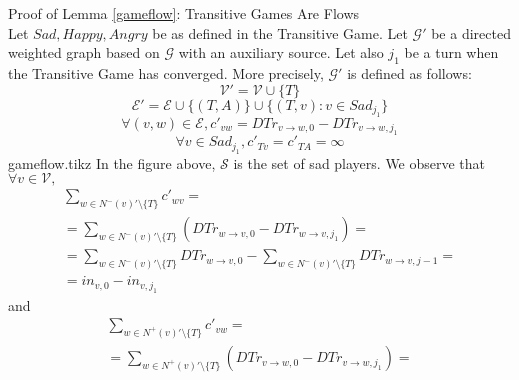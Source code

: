 \begin{sepproof}{Proof of Lemma \ref{gameflow}: Transitive Games Are Flows} \ \\
\label{gameflowproof}
   Let $Sad, Happy, Angry$ be as defined in the Transitive Game. Let $\mathcal{G}'$ be a directed weighted graph based on
   $\mathcal{G}$ with an auxiliary source. Let also $j_1$ be a turn when the Transitive Game has converged. More
   precisely, $\mathcal{G}'$ is defined as follows:
   \begin{equation*}
      \mathcal{V}' = \mathcal{V} \cup \{T\}
   \end{equation*}
   \begin{equation*}
      \mathcal{E}' = \mathcal{E} \cup \{(T, A)\} \cup \{(T, v) : v \in Sad_{j_1}\}
   \end{equation*}
   \begin{equation*}
      \forall (v, w) \in \mathcal{E}, c'_{vw} = DTr_{v \rightarrow w, 0} - DTr_{v \rightarrow w, j_1}
   \end{equation*}
   \begin{equation*}
      \forall v \in Sad_{j_1}, c'_{Tv} = c'_{TA} = \infty
   \end{equation*}
   {gameflow.tikz}
   In the figure above, $\mathcal{S}$ is the set of sad players. We observe that $\forall v \in \mathcal{V},$
   \begin{equation}
   \label{gameflowin}
   \begin{gathered}
      \sum\limits_{w \in N^{-}\left(v\right)' \setminus \{T\}}c'_{wv} = \\
      = \sum\limits_{w \in N^{-}\left(v\right)' \setminus \{T\}}\left(DTr_{w \rightarrow v, 0} -
      DTr_{w \rightarrow v, j_1}\right) = \\
      = \sum\limits_{w \in N^{-}\left(v\right)' \setminus \{T\}}DTr_{w \rightarrow v, 0} -
      \sum\limits_{w \in N^{-}\left(v\right)' \setminus \{T\}}DTr_{w \rightarrow v, j-1} =  \\
      = in_{v, 0} - in_{v, j_1}
   \end{gathered}
   \end{equation}
   and
   \begin{equation}
   \label{gameflowout}
   \begin{gathered}
      \sum\limits_{w \in N^{+}\left(v\right)' \setminus \{T\}}c'_{vw} = \\
      = \sum\limits_{w \in N^{+}\left(v\right)' \setminus \{T\}}\left(DTr_{v \rightarrow w, 0} -
      DTr_{v \rightarrow w, j_1}\right) = \\

\end{gathered}
\end{equation}
\end{sepproof}
